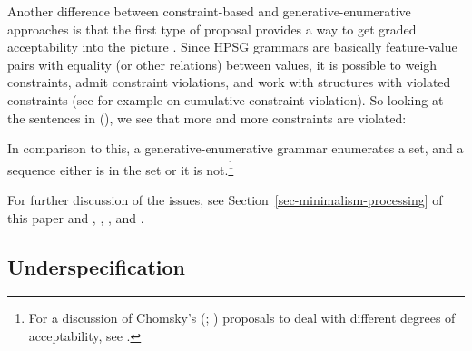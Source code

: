 \documentclass[output=paper
	        ,collection
	        ,collectionchapter
 	        ,biblatex
                ,babelshorthands
                ,newtxmath
                ,draftmode
                ,colorlinks, citecolor=brown
]{langscibook}
\begin{document}
Another difference between constraint-based and generative-enumerative approaches is that the first
type of proposal provides a way to get graded acceptability into the picture \citep[Section~3.1]{PS2001a}. Since HPSG grammars
are basically feature-value pairs with equality (or other relations) between values, it is possible
to weigh constraints, admit constraint violations, and work with structures with
violated constraints (see for example \citealp{SK2005a} on cumulative constraint violation). So looking at the sentences in (), we see that more and more constraints
are violated:
\eal
{}
\zl

\noindent
In comparison to this, a generative-enumerative grammar enumerates a set, and a
sequence either is in the set or it is not.\footnote{%
For a discussion of Chomsky's
(\citeyear{Chomsky64a}; \citeyear[Chapter~5]{Chomsky75a}) proposals to deal with different degrees
of acceptability, see .
}


For further discussion of the issues, see Section~\ref{sec-minimalism-processing} of
this paper and \eg \citet{PS2001a}, \citet{Postal2003a}, \citeauthor{SW2011a}
\citeyearpar{SW2011a,SW2015a}, and .  

\subsection{Underspecification}
\end{document}
